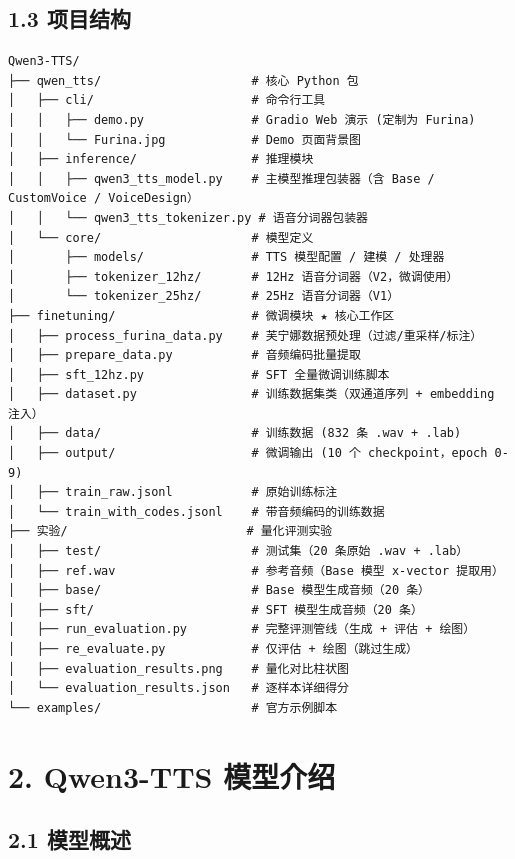 \documentclass[
  english,
  letterpaper,
  DIV=11,
  numbers=noendperiod]{scrartcl}
\begin{document}
\subsection{1.3 项目结构}\label{ux9879ux76eeux7ed3ux6784}

\begin{verbatim}
Qwen3-TTS/
├── qwen_tts/                     # 核心 Python 包
│   ├── cli/                      # 命令行工具
│   │   ├── demo.py               # Gradio Web 演示 (定制为 Furina)
│   │   └── Furina.jpg            # Demo 页面背景图
│   ├── inference/                # 推理模块
│   │   ├── qwen3_tts_model.py    # 主模型推理包装器（含 Base / CustomVoice / VoiceDesign）
│   │   └── qwen3_tts_tokenizer.py # 语音分词器包装器
│   └── core/                     # 模型定义
│       ├── models/               # TTS 模型配置 / 建模 / 处理器
│       ├── tokenizer_12hz/       # 12Hz 语音分词器（V2，微调使用）
│       └── tokenizer_25hz/       # 25Hz 语音分词器（V1）
├── finetuning/                   # 微调模块 ★ 核心工作区
│   ├── process_furina_data.py    # 芙宁娜数据预处理（过滤/重采样/标注）
│   ├── prepare_data.py           # 音频编码批量提取
│   ├── sft_12hz.py               # SFT 全量微调训练脚本
│   ├── dataset.py                # 训练数据集类（双通道序列 + embedding 注入）
│   ├── data/                     # 训练数据 (832 条 .wav + .lab)
│   ├── output/                   # 微调输出 (10 个 checkpoint，epoch 0-9)
│   ├── train_raw.jsonl           # 原始训练标注
│   └── train_with_codes.jsonl    # 带音频编码的训练数据
├── 实验/                         # 量化评测实验
│   ├── test/                     # 测试集（20 条原始 .wav + .lab）
│   ├── ref.wav                   # 参考音频（Base 模型 x-vector 提取用）
│   ├── base/                     # Base 模型生成音频（20 条）
│   ├── sft/                      # SFT 模型生成音频（20 条）
│   ├── run_evaluation.py         # 完整评测管线（生成 + 评估 + 绘图）
│   ├── re_evaluate.py            # 仅评估 + 绘图（跳过生成）
│   ├── evaluation_results.png    # 量化对比柱状图
│   └── evaluation_results.json   # 逐样本详细得分
└── examples/                     # 官方示例脚本
\end{verbatim}

\section{2. Qwen3-TTS 模型介绍}\label{sec-model}

\subsection{2.1 模型概述}\label{ux6a21ux578bux6982ux8ff0}
\end{document}
